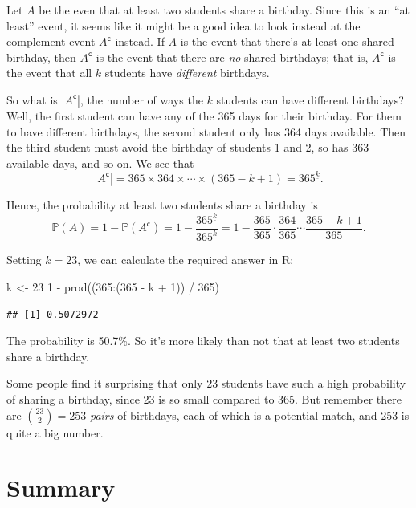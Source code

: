 \documentclass[
  a4paper,
]{book}
\newenvironment{Shaded}{\begin{snugshade}}{\end{snugshade}}
\newcommand{\DecValTok}[1]{\textcolor[rgb]{0.00,0.00,0.81}{#1}}
\newcommand{\FunctionTok}[1]{\textcolor[rgb]{0.00,0.00,0.00}{#1}}
\newcommand{\NormalTok}[1]{#1}
\newcommand{\OtherTok}[1]{\textcolor[rgb]{0.56,0.35,0.01}{#1}}
\newcommand{\SpecialCharTok}[1]{\textcolor[rgb]{0.00,0.00,0.00}{#1}}
\theoremstyle{definition}
\theoremstyle{definition}
\theoremstyle{definition}
\theoremstyle{definition}
\theoremstyle{remark}
\begin{document}
Let \(A\) be the even that at least two students share a birthday. Since this is an ``at least'' event, it seems like it might be a good idea to look instead at the complement event \(A^\mathsf{c}\) instead. If \(A\) is the event that there's at least one shared birthday, then \(A^\mathsf{c}\) is the event that there are \emph{no} shared birthdays; that is, \(A^\mathsf{c}\) is the event that all \(k\) students have \emph{different} birthdays.

So what is \(|A^\mathsf{c}|\), the number of ways the \(k\) students can have different birthdays? Well, the first student can have any of the 365 days for their birthday. For them to have different birthdays, the second student only has 364 days available. Then the third student must avoid the birthday of students 1 and 2, so has 363 available days, and so on. We see that
\[ |A^\mathsf{c}| = 365 \times 364 \times \cdots \times (365 - k + 1) = 365^{\underline{k}} . \]

Hence, the probability at least two students share a birthday is
\[ \mathbb P(A) = 1 - \mathbb P(A^\mathsf{c}) = 1 - \frac{365^{\underline{k}}}{365^k} = 1 - \frac{365}{365} \cdot \frac{364}{365} \cdots \frac{365-k+1}{365} . \]

Setting \(k = 23\), we can calculate the required answer in R:

\begin{Shaded}
\begin{Highlighting}[]
\NormalTok{k }\OtherTok{\textless{}{-}} \DecValTok{23}
\DecValTok{1} \SpecialCharTok{{-}} \FunctionTok{prod}\NormalTok{((}\DecValTok{365}\SpecialCharTok{:}\NormalTok{(}\DecValTok{365} \SpecialCharTok{{-}}\NormalTok{ k }\SpecialCharTok{+} \DecValTok{1}\NormalTok{)) }\SpecialCharTok{/} \DecValTok{365}\NormalTok{)}
\end{Highlighting}
\end{Shaded}

\begin{verbatim}
## [1] 0.5072972
\end{verbatim}

The probability is 50.7\%. So it's more likely than not that at least two students share a birthday.

Some people find it surprising that only 23 students have such a high probability of sharing a birthday, since 23 is so small compared to 365. But remember there are \(\binom{23}{2} = 253\) \emph{pairs} of birthdays, each of which is a potential match, and 253 is quite a big number.

\hypertarget{summary-03}{%
\section*{Summary}\label{summary-03}}
\end{document}
